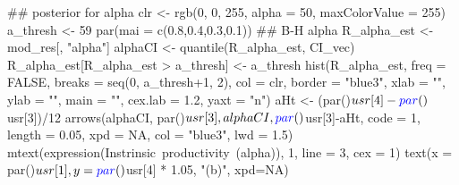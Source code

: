 \documentclass[11pt,]{article}
\newenvironment{Shaded}{}{}
\newcommand{\CommentTok}[1]{\textcolor[rgb]{0.00,0.50,0.00}{#1}}
\newcommand{\DataTypeTok}[1]{#1}
\newcommand{\DecValTok}[1]{#1}
\newcommand{\FloatTok}[1]{#1}
\newcommand{\KeywordTok}[1]{\textcolor[rgb]{0.00,0.00,1.00}{#1}}
\newcommand{\NormalTok}[1]{#1}
\newcommand{\OperatorTok}[1]{#1}
\newcommand{\OtherTok}[1]{\textcolor[rgb]{1.00,0.25,0.00}{#1}}
\newcommand{\StringTok}[1]{\textcolor[rgb]{0.00,0.50,0.50}{#1}}
\begin{document}
\begin{Shaded}
\begin{Highlighting}[]
\CommentTok{## posterior for alpha}
\NormalTok{clr <-}\StringTok{ }\KeywordTok{rgb}\NormalTok{(}\DecValTok{0}\NormalTok{, }\DecValTok{0}\NormalTok{, }\DecValTok{255}\NormalTok{, }\DataTypeTok{alpha =} \DecValTok{50}\NormalTok{, }\DataTypeTok{maxColorValue =} \DecValTok{255}\NormalTok{)}
\NormalTok{a_thresh <-}\StringTok{ }\DecValTok{59}
\KeywordTok{par}\NormalTok{(}\DataTypeTok{mai =} \KeywordTok{c}\NormalTok{(}\FloatTok{0.8}\NormalTok{,}\FloatTok{0.4}\NormalTok{,}\FloatTok{0.3}\NormalTok{,}\FloatTok{0.1}\NormalTok{))}
\CommentTok{## B-H alpha}
\NormalTok{R_alpha_est <-}\StringTok{ }\NormalTok{mod_res[, }\StringTok{"alpha"}\NormalTok{]}
\NormalTok{alphaCI <-}\StringTok{ }\KeywordTok{quantile}\NormalTok{(R_alpha_est, CI_vec)}
\NormalTok{R_alpha_est[R_alpha_est }\OperatorTok{>}\StringTok{ }\NormalTok{a_thresh] <-}\StringTok{ }\NormalTok{a_thresh}
\KeywordTok{hist}\NormalTok{(R_alpha_est, }\DataTypeTok{freq =} \OtherTok{FALSE}\NormalTok{, }\DataTypeTok{breaks =} \KeywordTok{seq}\NormalTok{(}\DecValTok{0}\NormalTok{, a_thresh}\OperatorTok{+}\DecValTok{1}\NormalTok{, }\DecValTok{2}\NormalTok{),}
     \DataTypeTok{col =}\NormalTok{ clr, }\DataTypeTok{border =} \StringTok{"blue3"}\NormalTok{,}
     \DataTypeTok{xlab =} \StringTok{""}\NormalTok{, }\DataTypeTok{ylab =} \StringTok{""}\NormalTok{, }\DataTypeTok{main =} \StringTok{""}\NormalTok{, }\DataTypeTok{cex.lab =} \FloatTok{1.2}\NormalTok{, }\DataTypeTok{yaxt =} \StringTok{"n"}\NormalTok{)}
\NormalTok{aHt <-}\StringTok{ }\NormalTok{(}\KeywordTok{par}\NormalTok{()}\OperatorTok{$}\NormalTok{usr[}\DecValTok{4}\NormalTok{]}\OperatorTok{-}\KeywordTok{par}\NormalTok{()}\OperatorTok{$}\NormalTok{usr[}\DecValTok{3}\NormalTok{])}\OperatorTok{/}\DecValTok{12}
\KeywordTok{arrows}\NormalTok{(alphaCI, }\KeywordTok{par}\NormalTok{()}\OperatorTok{$}\NormalTok{usr[}\DecValTok{3}\NormalTok{], alphaCI,}\KeywordTok{par}\NormalTok{()}\OperatorTok{$}\NormalTok{usr[}\DecValTok{3}\NormalTok{]}\OperatorTok{-}\NormalTok{aHt,}
       \DataTypeTok{code =} \DecValTok{1}\NormalTok{, }\DataTypeTok{length =} \FloatTok{0.05}\NormalTok{, }\DataTypeTok{xpd =} \OtherTok{NA}\NormalTok{, }\DataTypeTok{col =} \StringTok{"blue3"}\NormalTok{, }\DataTypeTok{lwd =} \FloatTok{1.5}\NormalTok{)}
\KeywordTok{mtext}\NormalTok{(}\KeywordTok{expression}\NormalTok{(Instrinsic}\OperatorTok{~}\NormalTok{productivity}\OperatorTok{~}\NormalTok{(alpha)), }\DecValTok{1}\NormalTok{, }\DataTypeTok{line =} \DecValTok{3}\NormalTok{, }\DataTypeTok{cex =} \DecValTok{1}\NormalTok{)}
\KeywordTok{text}\NormalTok{(}\DataTypeTok{x =} \KeywordTok{par}\NormalTok{()}\OperatorTok{$}\NormalTok{usr[}\DecValTok{1}\NormalTok{],}
     \DataTypeTok{y =} \KeywordTok{par}\NormalTok{()}\OperatorTok{$}\NormalTok{usr[}\DecValTok{4}\NormalTok{] }\OperatorTok{*}\StringTok{ }\FloatTok{1.05}\NormalTok{,}
     \StringTok{"(b)"}\NormalTok{, }\DataTypeTok{xpd=}\OtherTok{NA}\NormalTok{)}


\end{Highlighting}
\end{Shaded}
\end{document}

